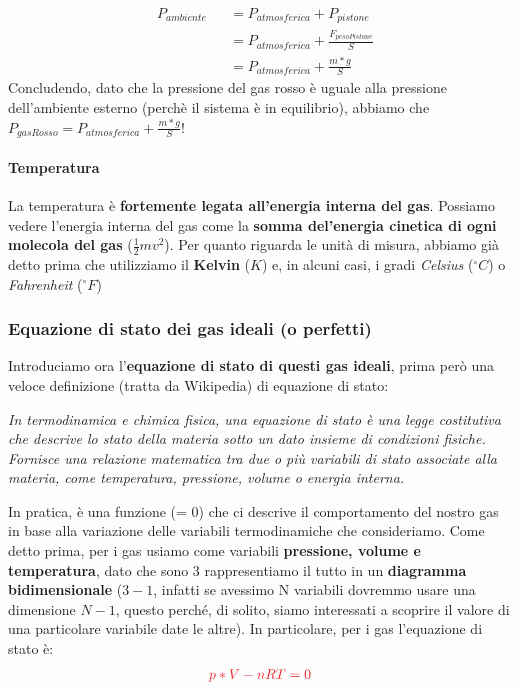                 \begin{align*}
                    &P_{ambiente}&&=P_{atmosferica}+P_{pistone}\\
                    & &&=P_{atmosferica}+\frac{F_{pesoPistone}}{S}\\
                    & &&=P_{atmosferica}+\frac{m*g}{S}
                \end{align*}
                Concludendo, dato che la pressione del gas rosso è uguale alla pressione dell'ambiente esterno (perchè il sistema è in equilibrio), abbiamo che $P_{gasRosso}=P_{atmosferica}+\frac{m*g}{S}$!

                \paragraph{Temperatura}
                    La temperatura è \textbf{fortemente legata all'energia interna del gas}. Possiamo vedere l'energia interna del gas come la \textbf{somma del'energia cinetica di ogni molecola del gas} ($\frac{1}{2}mv^2$). Per quanto riguarda le unità di misura, abbiamo già detto prima che utilizziamo il \textbf{Kelvin} ($K$) e, in alcuni casi, i gradi \textit{Celsius} ($^\circ C$) o \textit{Fahrenheit} ($^\circ F$)

            \subsubsection{Equazione di stato dei gas ideali (o perfetti)}
                Introduciamo ora l'\textbf{equazione di stato di questi gas ideali}, prima però una veloce definizione (tratta da Wikipedia) di equazione di stato:
                \begin{center}
                    \textit{In termodinamica e chimica fisica, una equazione di stato è una legge costitutiva che descrive lo stato della materia sotto un dato insieme di condizioni fisiche. Fornisce una relazione matematica tra due o più variabili di stato associate alla materia, come temperatura, pressione, volume o energia interna.}
                \end{center}
                In pratica, è una funzione (= 0) che ci descrive il comportamento del nostro gas in base alla variazione delle variabili termodinamiche che consideriamo. Come detto prima, per i gas usiamo come variabili \textbf{pressione, volume e temperatura}, dato che sono 3 rappresentiamo il tutto in un \textbf{diagramma bidimensionale} ($3-1$, infatti se avessimo N variabili dovremmo usare una dimensione $N-1$, questo perché, di solito, siamo interessati a scoprire il valore di una particolare variabile date le altre). In particolare, per i gas l'equazione di stato è:
                \begin{align*}
                    \textcolor{Red}{p*V - n R T = 0}
                \end{align*}

